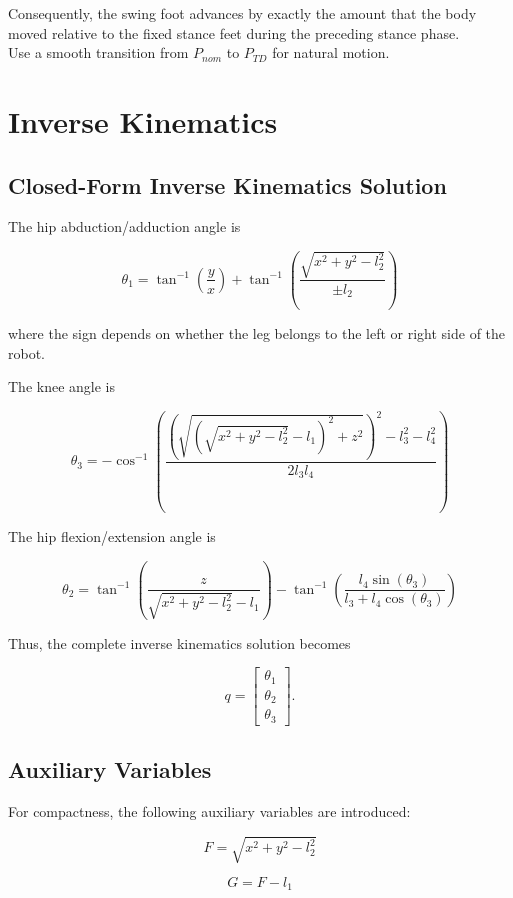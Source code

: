\documentclass[11pt,a4paper]{report}
\begin{document}
Consequently, the swing foot advances by exactly the amount that the
body moved relative to the fixed stance feet during the preceding
stance phase.\\
Use a smooth transition from $P_{nom}$ to $P_{TD}$ for natural motion.


\section{Inverse Kinematics}

\subsection{Closed-Form Inverse Kinematics Solution}

The hip abduction/adduction angle is

\[
\theta_1
=
\tan^{-1}\!\left(\frac{y}{x}\right)
+
\tan^{-1}
\!\left(
\frac
{\sqrt{x^2+y^2-l_2^2}}
{\pm l_2}
\right)
\]

where the sign depends on whether the leg belongs to the left or right
side of the robot.

The knee angle is

\[
\theta_3
=
-\cos^{-1}
\left(
\frac
{
\left(
\sqrt{
\left(
\sqrt{x^2+y^2-l_2^2}
-l_1
\right)^2
+z^2
}
\right)^2
-l_3^2-l_4^2
}
{2l_3l_4}
\right)
\]

The hip flexion/extension angle is

\[
\theta_2
=
\tan^{-1}
\left(
\frac
{z}
{\sqrt{x^2+y^2-l_2^2}-l_1}
\right)
-
\tan^{-1}
\left(
\frac
{l_4\sin(\theta_3)}
{l_3+l_4\cos(\theta_3)}
\right)
\]

Thus, the complete inverse kinematics solution becomes

\[
q=
\begin{bmatrix}
\theta_1\\
\theta_2\\
\theta_3
\end{bmatrix}.
\]

\subsection{Auxiliary Variables}

For compactness, the following auxiliary variables are introduced:

\[
F
=
\sqrt{x^2+y^2-l_2^2}
\]

\[
G
=
F-l_1
\]
\end{document}
